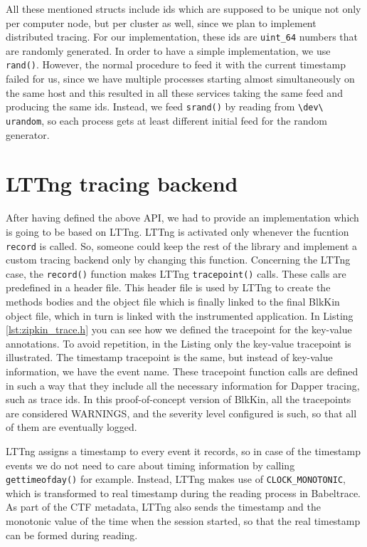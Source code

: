 
All these mentioned structs include ids which are supposed to be unique not only
per computer node, but per cluster as well, since we plan to implement
distributed tracing. For our implementation, these ids are \texttt{uint\_64}
numbers that are randomly generated. In order to have a simple implementation,
we use \texttt{rand()}. However, the normal procedure to feed it with the
current timestamp failed for us, since we have multiple processes starting
almost simultaneously on the same host and this resulted in all these services
taking the same feed and producing the same ids. Instead, we feed
\texttt{srand()} by reading from \texttt{\textbackslash dev\textbackslash
urandom}, so each process gets at least different initial feed for the random
generator.

\section{LTTng tracing backend}

After having defined the above API, we had to provide an implementation which is
going to be based on LTTng. LTTng is activated only whenever the fucntion
\texttt{record} is called. So, someone could keep the rest of the library and
implement a custom tracing backend only by changing this function. Concerning
the LTTng case, the \texttt{record()} function makes LTTng \texttt{tracepoint()}
calls. These calls are predefined in a header file. This header file is used by
LTTng to create the methods bodies and the object file which is finally linked
to the final BlkKin object file, which in turn is linked with the instrumented
application. In Listing \ref{lst:zipkin_trace.h} you can see how we defined the
tracepoint for the key-value annotations. To avoid repetition, in the Listing
only the key-value tracepoint is illustrated. The timestamp tracepoint is the
same, but instead of key-value information, we have the event name. These
tracepoint function calls are defined in such a way that they include all the
necessary information for Dapper tracing, such as trace ids. In this
proof-of-concept version of BlkKin, all the tracepoints are considered WARNINGS,
and the severity level configured is such, so that all of them are eventually
logged.


LTTng assigns a timestamp to every event it records, so in case of the
timestamp events we do not need to care about timing information by calling
\texttt{gettimeofday()} for example. Instead, LTTng makes use of
\texttt{CLOCK\_MONOTONIC}, which is transformed to real timestamp during the
reading process in Babeltrace. As part of the CTF metadata, LTTng also sends the
timestamp and the monotonic value of the time when the session started, so that
the real timestamp can be formed during reading.

